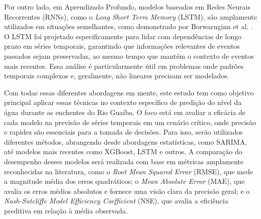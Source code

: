 Por outro lado, em Aprendizado Profundo, modelos baseados em Redes Neurais Recorrentes (RNNs), como o \textit{Long Short
Term Memory} (LSTM), são amplamente utilizados em situações semelhantes, como demonstrado por Borwarnginn et al.
\cite{borwarnginn}. O LSTM foi projetado especificamente para lidar com dependências de longo prazo em séries temporais,
garantindo que informações relevantes de eventos passados sejam preservadas, ao mesmo tempo que mantém o contexto de
eventos mais recentes. Essa análise é particularmente útil em problemas onde padrões temporais complexos e, geralmente,
não lineares precisam ser modelados.


Com todas essas diferentes abordagens em mente, este estudo tem como objetivo principal aplicar essas técnicas no
contexto específico de predição do nível da água durante as enchentes do Rio Guaíba. O foco está em avaliar a eficácia
de cada modelo na previsão de séries temporais em um cenário crítico, onde precisão e rapidez são essenciais para a
tomada de decisões. Para isso, serão utilizados diferentes métodos, abrangendo desde abordagens estatísticas, como
SARIMA, até modelos mais recentes como XGBoost, LSTM e outros. A comparação do desempenho desses modelos será
realizada com base em métricas amplamente reconhecidas na literatura, como o \textit{Root Mean Squared Error} (RMSE),
que mede a magnitude média dos erros quadráticos; o \textit{Mean Absolute Error} (MAE), que avalia os erros médios
absolutos e fornece uma visão clara da precisão geral; e o \textit{Nash-Sutcliffe Model Efficiency Coefficient} (NSE),
que avalia a eficiência preditiva em relação à média observada. 

